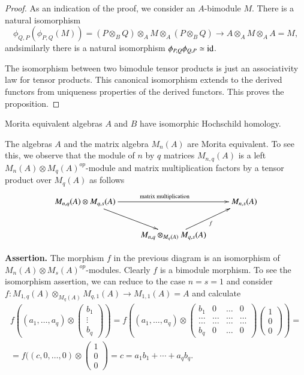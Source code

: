 \begin{proof}
As an indication of the proof, we consider an $A$-bimodule $M$. There
is a natural isomorphism
$$
\phi_{Q,P}(\phi_{P,Q}(M))=(P\otimes_{B}Q)\otimes_{A}M\otimes_{A}(P\otimes_{B}Q)\to
A\otimes_{A}M\otimes_{A}A=M,
$$
and\pageoriginale similarly there is a natural isomorphism
$\phi_{P,Q}\phi_{Q,P}\simeq \operatorname{id}$.

The isomorphism between two bimodule tensor products is just an
associativity law for tensor products. This canonical isomorphism
extends to the derived functors from uniqueness properties of the
derived functors. This proves the proposition.
\end{proof}

\begin{corollary}\label{chap3-coro5.3}
Morita equivalent algebras $A$ and $B$ have isomorphic Hochschild
homology.
\end{corollary}

\begin{example}\label{chap3-exam5.4}
The algebras $A$ and the matrix algebra $M_{n}(A)$ are Morita
equivalent. To see this, we observe that the module of $n$ by $q$
matrices $M_{n,q}(A)$ is a left $M_{n}(A)\otimes M_{q}(A)^{op}$-module
and matrix multiplication factors by a tensor product over $M_{q}(A)$
as follows
\[
\xymatrix{
M_{n,q}(A)\otimes M_{q,s}(A)\ar[dr] \ar[rr]^{\text{matrix
    multiplication}} & & M_{n,s}(A)\\
& M_{n,q}\otimes_{M_{q}(A)}M_{q,s}(A)\ar[ur]_{f} & 
}
\]
\end{example}

\noindent
{\bf Assertion.} The morphism $f$ in the previous diagram is an
isomorphism of $M_{n}(A)\otimes M_{s}(A)^{op}$-modules. Clearly $f$ is
a bimodule morphism. To see the isomorphism assertion, we can reduce
to the case $n=s=1$ and consider
$f:M_{1,q}(A)\otimes_{M_{q}(A)}M_{q,1}(A)\to M_{1,1}(A)=A$ and
calculate
\begin{gather*}
f\left((a_{1},\ldots,a_{q})\otimes
\begin{pmatrix}
b_{1}\\
\vdots\\
b_{q}
\end{pmatrix}
\right)=
f
\left(
(a_{1},\ldots,a_{q})\otimes
\begin{pmatrix}
b_{1} & 0 & \ldots & 0\\
\ldots & \ldots & \ldots & \ldots\\
\ldots & \ldots & \ldots & \ldots\\
b_{q} & 0 & \ldots & 0
\end{pmatrix}
\begin{pmatrix}
1\\
0\\
0
\end{pmatrix}
\right)=\\
=f((c,0,\ldots,0)\otimes 
\begin{pmatrix}
1\\
0\\
0
\end{pmatrix}
=c=a_{1}b_{1}+\cdots+a_{q}b_{q}.
\end{gather*}

